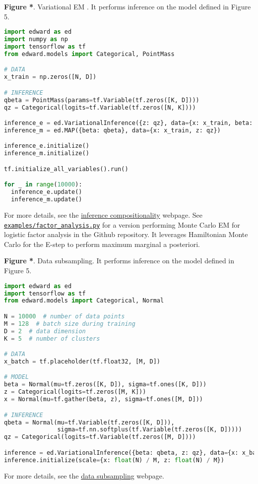 \textbf{Figure *}. Variational EM \citep{neal1993new}.
It performs inference on the model defined in Figure 5.
\begin{lstlisting}[language=python]
import edward as ed
import numpy as np
import tensorflow as tf
from edward.models import Categorical, PointMass

# DATA
x_train = np.zeros([N, D])

# INFERENCE
qbeta = PointMass(params=tf.Variable(tf.zeros([K, D])))
qz = Categorical(logits=tf.Variable(tf.zeros([N, K])))

inference_e = ed.VariationalInference({z: qz}, data={x: x_train, beta: qbeta})
inference_m = ed.MAP({beta: qbeta}, data={x: x_train, z: qz})

inference_e.initialize()
inference_m.initialize()

tf.initialize_all_variables().run()

for _ in range(10000):
  inference_e.update()
  inference_m.update()
\end{lstlisting}
For more details, see the
\href{/api/inference-compositionality}{inference compositionality} webpage.
See
\href{https://github.com/blei-lab/edward/blob/master/examples/factor_analysis.py}{\texttt{examples/factor_analysis.py}} for
a version performing Monte Carlo EM for logistic factor analysis
in the Github repository.
It leverages Hamiltonian Monte Carlo for the E-step to perform maximum
marginal a posteriori.

\textbf{Figure *}. Data subsampling.
It performs inference on the model defined in Figure 5.
\begin{lstlisting}[language=python]
import edward as ed
import tensorflow as tf
from edward.models import Categorical, Normal

N = 10000  # number of data points
M = 128  # batch size during training
D = 2  # data dimension
K = 5  # number of clusters

# DATA
x_batch = tf.placeholder(tf.float32, [M, D])

# MODEL
beta = Normal(mu=tf.zeros([K, D]), sigma=tf.ones([K, D]))
z = Categorical(logits=tf.zeros([M, K]))
x = Normal(mu=tf.gather(beta, z), sigma=tf.ones([M, D]))

# INFERENCE
qbeta = Normal(mu=tf.Variable(tf.zeros([K, D])),
               sigma=tf.nn.softplus(tf.Variable(tf.zeros([K, D]))))
qz = Categorical(logits=tf.Variable(tf.zeros([M, D])))

inference = ed.VariationalInference({beta: qbeta, z: qz}, data={x: x_batch})
inference.initialize(scale={x: float(N) / M, z: float(N) / M})
\end{lstlisting}
For more details, see the
\href{/api/inference-data-subsampling}{data subsampling} webpage.

